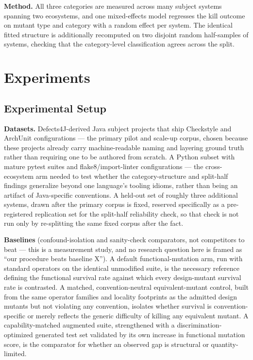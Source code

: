 \documentclass[11pt]{article}
\begin{document}
\textbf{Method.} All three categories are measured across many subject systems spanning two ecosystems, and one mixed-effects model regresses the kill outcome on mutant type and category with a random effect per system. The identical fitted structure is additionally recomputed on two disjoint random half-samples of systems, checking that the category-level classification agrees across the split.

\section{Experiments}

\subsection{Experimental Setup}

\textbf{Datasets.} Defects4J-derived Java subject projects that ship Checkstyle and ArchUnit configurations --- the primary pilot and scale-up corpus, chosen because these projects already carry machine-readable naming and layering ground truth rather than requiring one to be authored from scratch. A Python subset with mature pytest suites and flake8/import-linter configurations --- the cross-ecosystem arm needed to test whether the category-structure and split-half findings generalize beyond one language's tooling idioms, rather than being an artifact of Java-specific conventions. A held-out set of roughly three additional systems, drawn after the primary corpus is fixed, reserved specifically as a pre-registered replication set for the split-half reliability check, so that check is not run only by re-splitting the same fixed corpus after the fact.

\textbf{Baselines} (confound-isolation and sanity-check comparators, not competitors to beat --- this is a measurement study, and no research question here is framed as ``our procedure beats baseline X''). A default functional-mutation arm, run with standard operators on the identical unmodified suite, is the necessary reference defining the functional survival rate against which every design-mutant survival rate is contrasted. A matched, convention-neutral equivalent-mutant control, built from the same operator families and locality footprints as the admitted design mutants but not violating any convention, isolates whether survival is convention-specific or merely reflects the generic difficulty of killing any equivalent mutant. A capability-matched augmented suite, strengthened with a discrimination-optimized generated test set validated by its own increase in functional mutation score, is the comparator for whether an observed gap is structural or quantity-limited.
\end{document}
